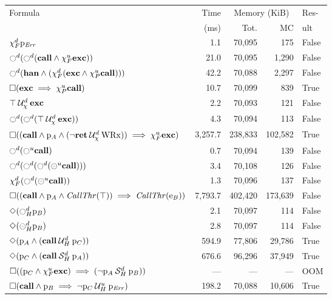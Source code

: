 \documentclass[9pt,a4paper]{article}
\begin{document}
\begin{table}[tb]
\centering
\fontsize{9pt}{10pt}\selectfont
\begin{tabular}{| l | r | r | r | l |}
\hline
Formula	& Time & \multicolumn{2}{c|}{Memory (KiB)} & Res- \\
\cline{3-4}
& (ms) & Tot. & MC & ult \\
\hline
$\chi_F^{d} \mathrm{p}_\mathit{Err}$ 	&	1.1	&	70,095	&	175	&	False	\\
$\ocircle^d (\ocircle^d (\mathbf{call} \land \chi_F^{u} \mathbf{exc}))$ 	&	21.0	&	70,095	&	1,290	&	False	\\
$\ocircle^d (\mathbf{han} \land (\chi_F^{d} (\mathbf{exc} \land \chi_P^{u} \mathbf{call})))$ 	&	42.2	&	70,088	&	2,297	&	False	\\
$\square (\mathbf{exc} \implies \chi_P^{u} \mathbf{call})$ 	&	10.7	&	70,099	&	839	&	True	\\
${\top} \mathbin{\mathcal{U}_\chi^d} {\mathbf{exc}}$ 	&	2.2	&	70,093	&	121	&	False	\\
$\ocircle^d (\ocircle^d ({\top} \mathbin{\mathcal{U}_\chi^d} {\mathbf{exc}}))$ 	&	4.3	&	70,094	&	113	&	False	\\
$\square ((\mathbf{call} \land \mathrm{p}_A \land ({\neg \mathbf{ret}} \mathbin{\mathcal{U}_\chi^d} {\mathrm{WRx}})) \implies \chi_F^{u} \mathbf{exc})$ 	&	3,257.7	&	238,833	&	102,582	&	True	\\
$\ocircle^d (\ocircle^u \mathbf{call})$ 	&	0.7	&	70,094	&	139	&	False	\\
$\ocircle^d (\ocircle^d (\ocircle^d (\circleddash^u \mathbf{call})))$ 	&	3.4	&	70,108	&	126	&	False	\\
$\chi_F^{d} (\ocircle^d (\circleddash^u \mathbf{call}))$ 	&	1.3	&	70,096	&	137	&	False	\\
$\square ((\mathbf{call} \land \mathrm{p}_A \land \mathit{CallThr}(\top)) \implies \mathit{CallThr}(\mathrm{e}_B))$ 	&	7,793.7	&	402,420	&	173,639	&	False	\\
$\Diamond (\ocircle_H^{d} \mathrm{p}_B)$ 	&	2.1	&	70,097	&	114	&	False	\\
$\Diamond (\circleddash_H^{d} \mathrm{p}_B)$ 	&	2.8	&	70,097	&	114	&	False	\\
$\Diamond (\mathrm{p}_A \land ({\mathbf{call}} \mathbin{\mathcal{U}_H^d} {\mathrm{p}_C}))$ 	&	594.9	&	77,806	&	29,786	&	True	\\
$\Diamond (\mathrm{p}_C \land ({\mathbf{call}} \mathbin{\mathcal{S}_H^d} {\mathrm{p}_A}))$ 	&	676.6	&	96,296	&	37,949	&	True	\\
$\square ((\mathrm{p}_C \land \chi_F^{u} \mathbf{exc}) \implies ({\neg \mathrm{p}_A} \mathbin{\mathcal{S}_H^d} {\mathrm{p}_B}))$ 	&	---	&	---	&	---	&	OOM	\\
$\square (\mathbf{call} \land \mathrm{p}_B \implies {\neg \mathrm{p}_C} \mathbin{\mathcal{U}_H^u} {\mathrm{p}_\mathit{Err}})$ 	&	198.2	&	70,088	&	10,606	&	True	\\

\end{tabular}
\end{table}
\end{document}
